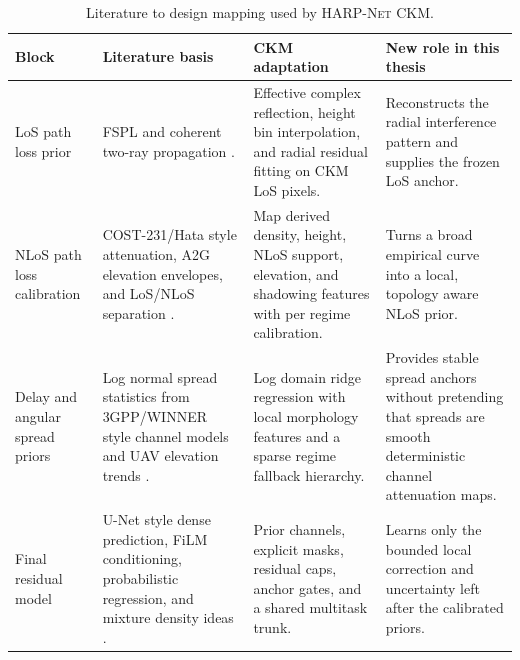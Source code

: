 \begin{table}[H]
\centering
\caption{Literature to design mapping used by \textsc{HARP-Net CKM}.}
\label{tab:prior_literature_mapping}
\scriptsize
\renewcommand{\arraystretch}{1.12}
\begin{tabularx}{\textwidth}{>{\raggedright\arraybackslash}p{}
>{\raggedright\arraybackslash}X
>{\raggedright\arraybackslash}X
>{\raggedright\arraybackslash}X}
\toprule
Block & Literature basis & CKM adaptation & New role in this thesis \\
\midrule
LoS path loss prior &
FSPL and coherent two-ray propagation \cite{rappaport,wocc2021}. &
Effective complex reflection, height bin interpolation, and radial residual
fitting on CKM LoS pixels. &
Reconstructs the radial interference pattern and supplies the frozen LoS
anchor. \\
NLoS path loss calibration &
COST-231/Hata style attenuation, A2G elevation envelopes, and LoS/NLoS
separation \cite{cost231,tr38901,alhourani2014,khawaja_survey}. &
Map derived density, height, NLoS support, elevation, and shadowing features
with per regime calibration. &
Turns a broad empirical curve into a local, topology aware NLoS prior. \\
Delay and angular spread priors &
Log normal spread statistics from 3GPP/WINNER style channel models and UAV
elevation trends \cite{tr38901,winner2,yang2019a2gml,huang2025a2gtransformer}. &
Log domain ridge regression with local morphology features and a sparse regime
fallback hierarchy. &
Provides stable spread anchors without pretending that spreads are smooth
deterministic channel attenuation maps. \\
Final residual model &
U-Net style dense prediction, FiLM conditioning, probabilistic regression, and
mixture density ideas
\cite{isola2017pix2pix,pmnet2023,perez2018film,kendall2017uncertainties,saleh2021probabilistic,garciamarti2020mixture}. &
Prior channels, explicit masks, residual caps, anchor gates, and a shared
multitask trunk. &
Learns only the bounded local correction and uncertainty left after the
calibrated priors. \\
\bottomrule
\end{tabularx}
\end{table}
